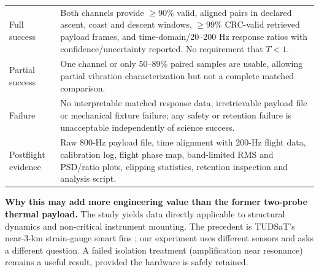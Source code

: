 \begin{longtable}{@{}L{39mm}L{107mm}@{}}
Full success & Both channels provide $\ge90\%$ valid, aligned pairs in declared ascent, coast and descent windows, $\ge99\%$ CRC-valid retrieved payload frames, and time-domain/20--200 Hz response ratios with confidence/uncertainty reported. No requirement that $T<1$.\\
Partial success & One channel or only 50--89\% paired samples are usable, allowing partial vibration characterization but not a complete matched comparison.\\
Failure & No interpretable matched response data, irretrievable payload file or mechanical fixture failure; any safety or retention failure is unacceptable independently of science success.\\
Postflight evidence & Raw 800-Hz payload file, time alignment with 200-Hz flight data, calibration log, flight phase map, band-limited RMS and PSD/ratio plots, clipping statistics, retention inspection and analysis script.\\
\end{longtable}
\endgroup %
\normalsize

\textbf{Why this may add more engineering value than the former two-probe thermal payload.} The study yields data directly applicable to structural dynamics and non-critical instrument mounting. The precedent is TUDSaT's near-3-km strain-gauge smart fins \cite{tudsat2024frodo}; our experiment uses different sensors and asks a different question. A failed isolation treatment (amplification near resonance) remains a useful result, provided the hardware is safely retained.

